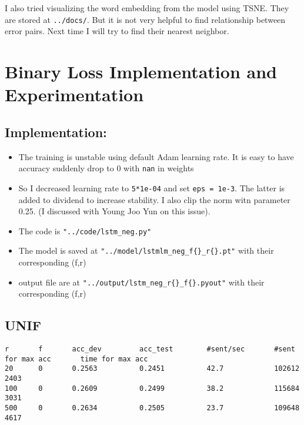 \documentclass[11pt]{article}
\providecommand{\tightlist}{%
      \setlength{\itemsep}{0pt}\setlength{\parskip}{0pt}}
\begin{document}
I also tried visualizing the word embedding from the model using TSNE.
They are stored at \texttt{../docs/}. But it is not very helpful to find
relationship between error pairs. Next time I will try to find their
nearest neighbor.

    \section{Binary Loss Implementation and
Experimentation}\label{binary-loss-implementation-and-experimentation}

    \subsection{Implementation:}\label{implementation}

\begin{itemize}
\tightlist
\item
  The training is unstable using default Adam learning rate. It is easy
  to have accuracy suddenly drop to 0 with \texttt{nan} in weights
\item
  So I decreased learning rate to \texttt{5*1e-04} and set
  \texttt{eps\ =\ 1e-3}. The latter is added to dividend to increase
  stability. I also clip the norm witn parameter 0.25. (I discussed with
  Young Joo Yun on this issue).
\item
  The code is \texttt{"../code/lstm\_neg.py"}
\item
  The model is saved at \texttt{"../model/lstmlm\_neg\_f\{\}\_r\{\}.pt"}
  with their corresponding (f,r)
\item
  output file are at \texttt{"../output/lstm\_neg\_r\{\}\_f\{\}.pyout"}
  with their corresponding (f,r)
\end{itemize}

    \subsection{UNIF}\label{unif}

\begin{verbatim}
r       f       acc_dev         acc_test        #sent/sec       #sent for max acc       time for max acc
20      0       0.2563          0.2451          42.7            102612                  2403
100     0       0.2609          0.2499          38.2            115684                  3031
500     0       0.2634          0.2505          23.7            109648                  4617
\end{verbatim}
\end{document}
